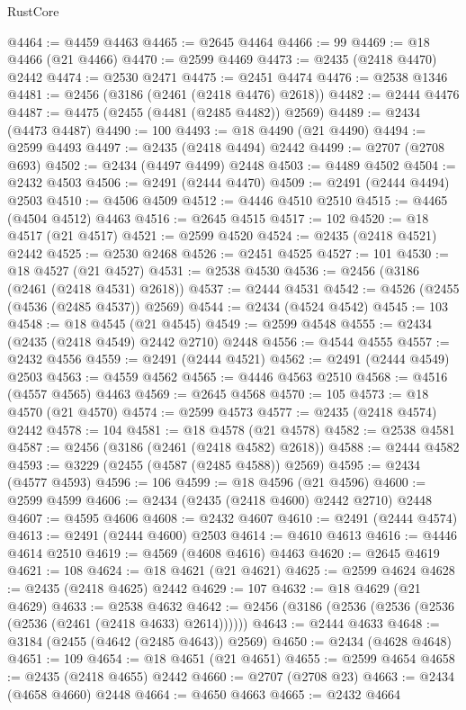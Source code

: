 \begin{lexlean}{RustCore}
\begin{coremodule}
@4464 := @4459 @4463
@4465 := @2645 @4464
@4466 := 99
@4469 := @18 @4466 (@21 @4466)
@4470 := @2599 @4469
@4473 := @2435 (@2418 @4470) @2442
@4474 := @2530 @2471
@4475 := @2451 @4474
@4476 := @2538 @1346
@4481 := @2456 (@3186 (@2461 (@2418 @4476) @2618))
@4482 := @2444 @4476
@4487 := @4475 (@2455 (@4481 (@2485 @4482)) @2569)
@4489 := @2434 (@4473 @4487)
@4490 := 100
@4493 := @18 @4490 (@21 @4490)
@4494 := @2599 @4493
@4497 := @2435 (@2418 @4494) @2442
@4499 := @2707 (@2708 @693)
@4502 := @2434 (@4497 @4499) @2448
@4503 := @4489 @4502
@4504 := @2432 @4503
@4506 := @2491 (@2444 @4470)
@4509 := @2491 (@2444 @4494) @2503
@4510 := @4506 @4509
@4512 := @4446 @4510 @2510
@4515 := @4465 (@4504 @4512) @4463
@4516 := @2645 @4515
@4517 := 102
@4520 := @18 @4517 (@21 @4517)
@4521 := @2599 @4520
@4524 := @2435 (@2418 @4521) @2442
@4525 := @2530 @2468
@4526 := @2451 @4525
@4527 := 101
@4530 := @18 @4527 (@21 @4527)
@4531 := @2538 @4530
@4536 := @2456 (@3186 (@2461 (@2418 @4531) @2618))
@4537 := @2444 @4531
@4542 := @4526 (@2455 (@4536 (@2485 @4537)) @2569)
@4544 := @2434 (@4524 @4542)
@4545 := 103
@4548 := @18 @4545 (@21 @4545)
@4549 := @2599 @4548
@4555 := @2434 (@2435 (@2418 @4549) @2442 @2710) @2448
@4556 := @4544 @4555
@4557 := @2432 @4556
@4559 := @2491 (@2444 @4521)
@4562 := @2491 (@2444 @4549) @2503
@4563 := @4559 @4562
@4565 := @4446 @4563 @2510
@4568 := @4516 (@4557 @4565) @4463
@4569 := @2645 @4568
@4570 := 105
@4573 := @18 @4570 (@21 @4570)
@4574 := @2599 @4573
@4577 := @2435 (@2418 @4574) @2442
@4578 := 104
@4581 := @18 @4578 (@21 @4578)
@4582 := @2538 @4581
@4587 := @2456 (@3186 (@2461 (@2418 @4582) @2618))
@4588 := @2444 @4582
@4593 := @3229 (@2455 (@4587 (@2485 @4588)) @2569)
@4595 := @2434 (@4577 @4593)
@4596 := 106
@4599 := @18 @4596 (@21 @4596)
@4600 := @2599 @4599
@4606 := @2434 (@2435 (@2418 @4600) @2442 @2710) @2448
@4607 := @4595 @4606
@4608 := @2432 @4607
@4610 := @2491 (@2444 @4574)
@4613 := @2491 (@2444 @4600) @2503
@4614 := @4610 @4613
@4616 := @4446 @4614 @2510
@4619 := @4569 (@4608 @4616) @4463
@4620 := @2645 @4619
@4621 := 108
@4624 := @18 @4621 (@21 @4621)
@4625 := @2599 @4624
@4628 := @2435 (@2418 @4625) @2442
@4629 := 107
@4632 := @18 @4629 (@21 @4629)
@4633 := @2538 @4632
@4642 := @2456 (@3186 (@2536 (@2536 (@2536 (@2536 (@2461 (@2418 @4633) @2614))))))
@4643 := @2444 @4633
@4648 := @3184 (@2455 (@4642 (@2485 @4643)) @2569)
@4650 := @2434 (@4628 @4648)
@4651 := 109
@4654 := @18 @4651 (@21 @4651)
@4655 := @2599 @4654
@4658 := @2435 (@2418 @4655) @2442
@4660 := @2707 (@2708 @23)
@4663 := @2434 (@4658 @4660) @2448
@4664 := @4650 @4663
@4665 := @2432 @4664

\end{coremodule}
\end{lexlean}
